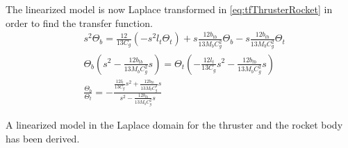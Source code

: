 		The linearized model is now Laplace transformed in \vref{eq:tfThrusterRocket} in order to find the transfer function.
		\begin{subequations}
			\begin{flalign}
				& s^2\Theta_b=\frac{12}{13C_g}\left(-s^2l_t\Theta_t\right)+s\frac{12b_{tb}}{13M_bC_g^2}\Theta_b-s\frac{12b_{tb}}{13M_bC_g^2}\Theta_t  \\
				& \Theta_b\left(s^2-\frac{12b_{tb}}{13M_bC_g^2}s\right)=\Theta_t\left(-\frac{12l_t}{13C_g}s^2-\frac{12b_{tb}}{13M_bC_g^2}s\right)  \\
				& \frac{\Theta_b}{\Theta_t}=-\frac{\frac{12l_t}{13C_g}s^2+\frac{12b_{tb}}{13M_bC_g^2}s}{s^2-\frac{12b_{tb}}{13M_bC_g^2}s} \label{eq:tfThrusterRocket}
			\end{flalign}
		\end{subequations}
		
		A linearized model in the Laplace domain for the thruster and the rocket body has been derived.



